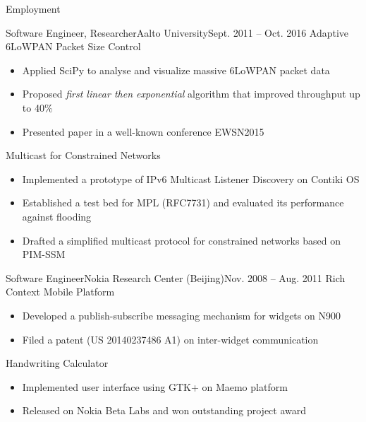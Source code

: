 \documentclass[print]{mcdowellcv}
\begin{document}
\begin{cvsection}{Employment}
		\begin{cvsubsection}{Software Engineer, Researcher}{Aalto University}{Sept. 2011 -- Oct. 2016}
			Adaptive 6LoWPAN Packet Size Control
			\begin{itemize}
				\item Applied SciPy to analyse and visualize massive 6LoWPAN packet data
				\item Proposed \textit{first linear then exponential} algorithm that improved throughput up to 40\%
				\item Presented paper in a well-known conference EWSN2015
			\end{itemize}
			\smallskip
			Multicast for Constrained Networks
			\begin{itemize}
				\item Implemented a prototype of IPv6 Multicast Listener Discovery on Contiki OS
				\item Established a test bed for MPL (RFC7731) and evaluated its performance against flooding 
				\item Drafted a simplified multicast protocol for constrained networks based on PIM-SSM
			\end{itemize}
		\end{cvsubsection}

		\begin{cvsubsection}{Software Engineer}{Nokia Research Center (Beijing)}{Nov. 2008 -- Aug. 2011}
			Rich Context Mobile Platform
			\begin{itemize}
				\item Developed a publish-subscribe messaging mechanism for widgets on N900
				\item Filed a patent (US 20140237486 A1) on inter-widget communication
			\end{itemize}
			\smallskip
			Handwriting Calculator
			\begin{itemize}
				\item Implemented user interface using GTK+ on Maemo platform
				\item Released on Nokia Beta Labs and won outstanding project award
			\end{itemize}
		\end{cvsubsection}

	\end{cvsection}
\end{document}
